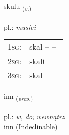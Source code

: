 \documentclass[frontgrid, backgrid]{flacards}\usepackage[]{graphicx}\usepackage[]{xcolor}
\begin{document}
{skulu \small{\textsubscript{(\textit{v.})}} \\[1ex] %
\textphonetic{[skʏːlʏ]} \\
pl.: \emph{musieć} \\  [2ex]
\renewcommand*{\arraystretch}{0.8}
\begin{tabular}{p{1cm}l}
\textsc{1sg}: & skal --  --  \\ 
\textsc{2sg}: & skalt --  --  \\ 
\textsc{3sg}: & skal --  --  \\ 
\end{tabular}
}


\renewcommand{\flhead}{\vskip5pt \fboxsep=0pt {\small\bfseries\footnotesize Forsetning | przyimek}}
\renewcommand{\fcfoot}{\vskip5pt \fboxsep=0pt \hspace{2pt}{\small\bfseries\footnotesize 1K}}

\renewcommand{\blhead}{\vskip5pt {\small\bfseries\footnotesize Forsetning | przyimek }}
\renewcommand{\bcfoot}{\vskip5pt \hspace{2pt}{\small\bfseries\footnotesize 1K}}


{inn \small{\textsubscript{(\textit{prep.})}} \\[1ex]
\textphonetic{[ɪn]} \\
pl.: \emph{w, do; wewnątrz} \\  [2ex]
inn (Indeclinable)}

\renewcommand{\flhead}{\vskip5pt \fboxsep=0pt {\small\bfseries\footnotesize Lýsingarorð | przymiotnik}}
\renewcommand{\fcfoot}{\vskip5pt \fboxsep=0pt \hspace{2pt}{\small\bfseries\footnotesize 1K}}

\renewcommand{\blhead}{\vskip5pt {\small\bfseries\footnotesize Lýsingarorð | przymiotnik }}
\renewcommand{\bcfoot}{\vskip5pt \hspace{2pt}{\small\bfseries\footnotesize 1K}}
\end{document}
